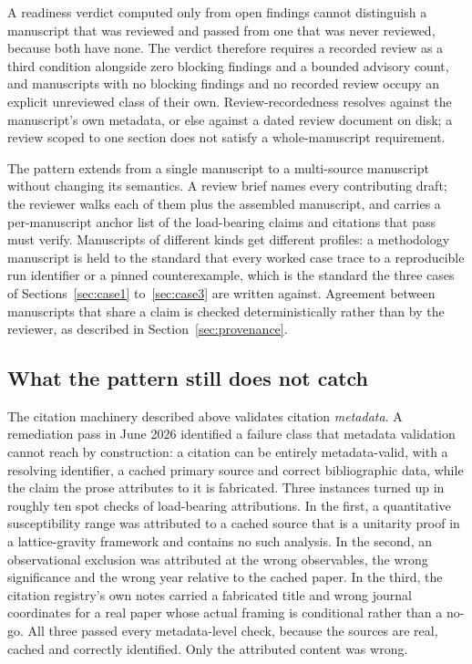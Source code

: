 \documentclass[11pt]{article}
\begin{document}
A readiness verdict computed only from open findings cannot
distinguish a manuscript that was reviewed and passed from one that
was never reviewed, because both have none. The verdict therefore
requires a recorded review as a third condition alongside zero
blocking findings and a bounded advisory count, and manuscripts with
no blocking findings and no recorded review occupy an explicit
unreviewed class of their own. Review-recordedness resolves against
the manuscript's own metadata, or else against a dated review
document on disk; a review scoped to one section does not satisfy a
whole-manuscript requirement.

The pattern extends from a single manuscript to a multi-source
manuscript without changing its semantics. A review brief names every
contributing draft; the reviewer walks each of them plus the
assembled manuscript, and carries a per-manuscript anchor list of the
load-bearing claims and citations that pass must verify. Manuscripts
of different kinds get different profiles: a methodology manuscript
is held to the standard that every worked case trace to a
reproducible run identifier or a pinned counterexample, which is the
standard the three cases of Sections~\ref{sec:case1}
to~\ref{sec:case3} are written against. Agreement between manuscripts
that share a claim is checked deterministically rather than by the
reviewer, as described in Section~\ref{sec:provenance}.

\subsection{What the pattern still does not catch}

The citation machinery described above validates citation
\emph{metadata}. A remediation pass in June 2026 identified a failure
class that metadata validation cannot reach by construction: a
citation can be entirely metadata-valid, with a resolving identifier,
a cached primary source and correct bibliographic data, while the
claim the prose attributes to it is fabricated. Three instances
turned up in roughly ten spot checks of load-bearing attributions. In
the first, a quantitative susceptibility range was attributed to a
cached source that is a unitarity proof in a lattice-gravity
framework and contains no such analysis. In the second, an
observational exclusion was attributed at the wrong observables, the
wrong significance and the wrong year relative to the cached paper.
In the third, the citation registry's own notes carried a fabricated
title and wrong journal coordinates for a real paper whose actual
framing is conditional rather than a no-go. All three passed every
metadata-level check, because the sources are real, cached and
correctly identified. Only the attributed content was wrong.
\end{document}
